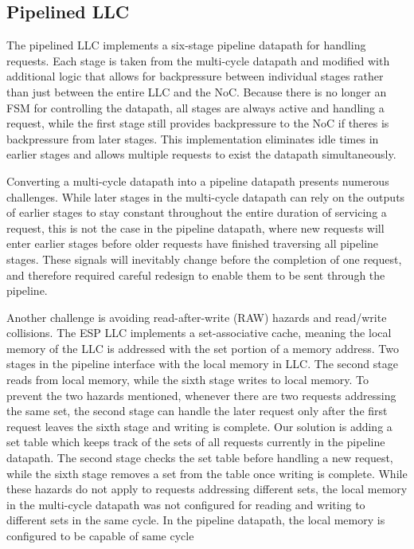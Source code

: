 \documentclass{sig-alternate}
\begin{document}
\subsection{Pipelined LLC}
The pipelined LLC implements a six-stage pipeline datapath for handling requests. Each stage is taken from the multi-cycle datapath and modified with additional logic 
that allows for backpressure between individual stages rather than just between the entire LLC and the NoC. Because there is no longer an FSM for controlling the datapath, 
all stages are always active and handling a request, while the first stage still provides backpressure to the NoC if theres is backpressure from later stages. This implementation
eliminates idle times in earlier stages and allows multiple requests to exist the datapath simultaneously. 
\par Converting a multi-cycle datapath into a pipeline datapath presents numerous challenges. While later stages in the multi-cycle datapath can rely on the outputs of earlier stages to 
stay constant throughout the entire duration of servicing a request, this is not the case in the pipeline datapath, where new requests will enter earlier stages before older requests have finished traversing all pipeline stages. 
These signals will inevitably change before the completion of one request, and therefore required careful redesign to enable them to be sent through the pipeline.
\par Another challenge is avoiding read-after-write (RAW) hazards and read/write collisions. The ESP LLC implements a set-associative cache, meaning the local memory
of the LLC is addressed with the set portion of a memory address. Two stages in the pipeline interface with the local memory in LLC. The second stage 
reads from local memory, while the sixth stage writes to local memory. To prevent the two hazards mentioned, whenever there are two requests addressing the same set, the second stage 
can handle the later request only after the first request leaves the sixth stage and writing is complete. Our solution is adding a set table which keeps track of the sets of all requests currently 
in the pipeline datapath. The second stage checks the set table before handling a new request, while the sixth stage removes a set from the table once writing is complete. While these hazards do not apply to requests addressing 
different sets, the local memory in the multi-cycle datapath was not configured for reading and writing to different sets in the same cycle. In the pipeline datapath, the local memory is configured to be capable of same cycle 
\end{document}
